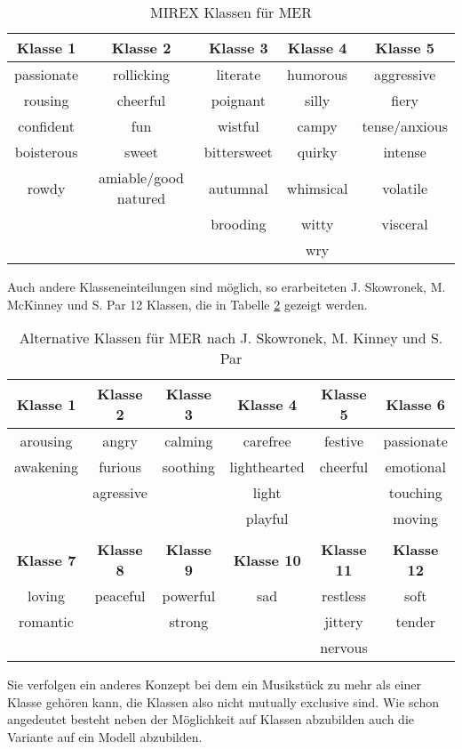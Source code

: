 \documentclass[11pt,a4paper]{article}
\begin{document}
\begin{table}[!ht]
\centering
\begin{tabular}{c c c c c}
\textbf{Klasse 1} & \textbf{Klasse 2} & \textbf{Klasse 3} & \textbf{Klasse 4} & \textbf{Klasse 5} \\
\hline
passionate & rollicking & literate & humorous & aggressive \\
rousing & cheerful & poignant & silly & fiery \\
confident & fun & wistful & campy & tense/anxious \\
boisterous & sweet & bittersweet & quirky & intense \\
rowdy & amiable/good natured & autumnal & whimsical & volatile \\
 & & brooding & witty & visceral \\
  & & & wry &
\end{tabular}
\caption[MIREX Music Emotion Recognition Klassen]{MIREX Klassen für MER}
\label{tab:MIREXclasses}
\end{table}
\noindent
Auch andere Klasseneinteilungen sind möglich, so erarbeiteten J. Skowronek, M. McKinney und S. Par  \cite{7cd5f337a4b030e3fafd0b4bc7e0976ff7cc1ec8c28d583c5dab695e0ee78941} 12 Klassen, die in Tabelle \ref{tab:altclasses} gezeigt werden.\\

\begin{table}[!ht]
\centering
\begin{tabular}{c c c c c c}
\textbf{Klasse 1} & \textbf{Klasse 2} & \textbf{Klasse 3} & \textbf{Klasse 4} & \textbf{Klasse 5} & \textbf{Klasse 6} \\
\hline
arousing  & angry     & calming  & carefree     & festive  & passionate \\
awakening & furious   & soothing & lighthearted & cheerful & emotional \\
          & agressive &          & light        &          & touching    \\
          &           &          & playful      &          & moving      \\
\vspace{10pt}\\
\textbf{Klasse 7} & \textbf{Klasse 8} & \textbf{Klasse 9} & \textbf{Klasse 10} & \textbf{Klasse 11} & \textbf{Klasse 12}\\
\hline
loving   & peaceful & powerful & sad & restless & soft\\
romantic &          & strong   &     & jittery  & tender\\
         &          &          &     & nervous  & \\
\end{tabular}
\caption[Alternative Music Emotion Recognition Klassen]{Alternative Klassen für MER nach J. Skowronek, M. Kinney und S. Par \cite{7cd5f337a4b030e3fafd0b4bc7e0976ff7cc1ec8c28d583c5dab695e0ee78941}}
\label{tab:altclasses}
\end{table}
\noindent
Sie verfolgen ein anderes Konzept bei dem ein Musikstück zu mehr als einer Klasse gehören kann, die Klassen also nicht mutually exclusive sind. Wie schon angedeutet besteht neben der Möglichkeit auf Klassen abzubilden auch die Variante auf ein Modell abzubilden. 
\end{document}
